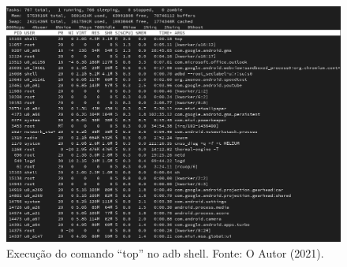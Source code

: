 \documentclass[12pt, a4paper]{article}
\begin{document}
    \begin{figure}[!ht]
        \centering
        \includegraphics[width=\textwidth,height=0.35\textheight,keepaspectratio]{adb-top.png}
        \caption{Execução do comando ``top'' no adb shell. Fonte: O Autor (2021).}
        \label{fig:top}
    \end{figure}

\clearpage

\nocite{android:processes-and-threads}

\end{document}
